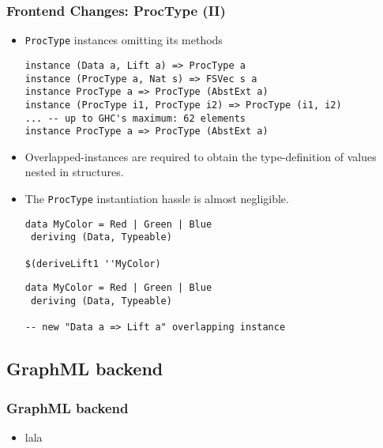 \documentclass{beamer}
\begin{document}
\begin{frame}[fragile]
  \frametitle{Frontend Changes:  ProcType (II)}
  \begin{itemize}
  \item<1-> \texttt{ProcType} instances omitting its methods
\begin{lstlisting}
instance (Data a, Lift a) => ProcType a
instance (ProcType a, Nat s) => FSVec s a
instance ProcType a => ProcType (AbstExt a)
instance (ProcType i1, ProcType i2) => ProcType (i1, i2)
... -- up to GHC's maximum: 62 elements
instance ProcType a => ProcType (AbstExt a)
\end{lstlisting}
  \item<2-> Overlapped-instances are required to obtain the
    type-definition of values nested in structures.
  \item<3-> The \texttt{ProcType} instantiation hassle is almost negligible.
    \begin{overprint}
\begin{lstlisting}
data MyColor = Red | Green | Blue
 deriving (Data, Typeable)

$(deriveLift1 ''MyColor)
\end{lstlisting}
\begin{lstlisting}
data MyColor = Red | Green | Blue
 deriving (Data, Typeable)

-- new "Data a => Lift a" overlapping instance
\end{lstlisting} 
\end{overprint}     
    
  \end{itemize}
\end{frame}

\subsection{GraphML backend}

\begin{frame}[fragile]
  \frametitle{GraphML backend}
  \begin{itemize}
  \item lala
  \end{itemize}
  
\end{frame}
\end{document}
